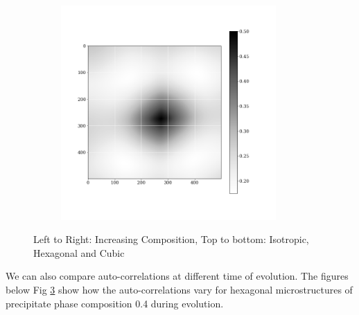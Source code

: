 \documentclass[12pt, a4paper]{report}
\begin{document}
\begin{figure}[H]
\begin{subfigure}{.32\textwidth}
  \label{img:microstrImg}
\end{subfigure}
\begin{subfigure}{.32\textwidth}
  \centering
  \includegraphics[width=0.9\textwidth]{Pictures/images9/cub_image_05_560.png}
  \label{img:microstrImg}
\end{subfigure}
\caption{Left to Right: Increasing Composition, Top to bottom: Isotropic, Hexagonal and Cubic }
\label{fig:big9fig}
\end{figure}


We can also compare auto-correlations at different time of evolution. The figures below Fig \ref{fig:big9fig} show how the auto-correlations vary for hexagonal microstructures of precipitate phase composition 0.4 during evolution.
\end{document}

